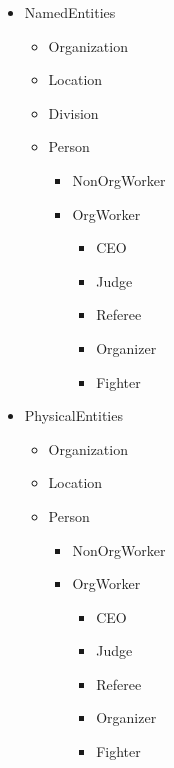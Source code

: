 \documentclass[a4paper]{article}
\begin{document}
\begin{figure}[H]
\centering
\begin{subfigure}{.3\textwidth}
	\centering
	\begin{itemize}
		\item NamedEntities
		\begin{itemize}
			\item Organization
			\item Location
			\item Division
			\item Person
			\begin{itemize}
				\item NonOrgWorker
				\item OrgWorker
				\begin{itemize}
					\item CEO
					\item Judge
					\item Referee
					\item Organizer
					\item Fighter
				\end{itemize}
			\end{itemize}
		\end{itemize}
	\end{itemize}
	\label{fig:name_entities}
\end{subfigure}%
\begin{subfigure}{.3\textwidth}
	\centering
	\begin{itemize}
		\item PhysicalEntities
		\begin{itemize}
			\item Organization
			\item Location
			\item Person
			\begin{itemize}
				\item NonOrgWorker
				\item OrgWorker
				\begin{itemize}
					\item CEO
					\item Judge
					\item Referee
					\item Organizer
					\item Fighter
				\end{itemize}
			\end{itemize}
		\end{itemize}
	\end{itemize}

\end{subfigure}
\end{figure}
\end{document}
